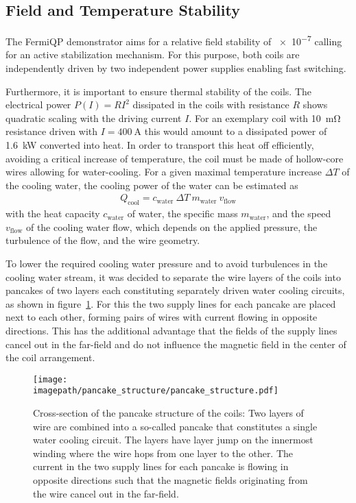 \subsection*{Field and Temperature Stability}
The FermiQP demonstrator aims for a relative field stability of \SI{e-7}{} calling for an active stabilization mechanism. For this purpose, both coils are independently driven by two independent power supplies enabling fast switching.

Furthermore, it is important to ensure thermal stability of the coils. The electrical power $P(I) = RI^2$ dissipated in the coils with resistance $R$ shows quadratic scaling  with the driving current $I$. For an exemplary coil with \SI{10}{\milli\ohm} resistance driven with $I = \SI{400}{\ampere}$ this would amount to a dissipated power of \SI{1.6}{\kilo\watt} converted into heat. In order to transport this heat off efficiently, avoiding a critical increase of temperature, the coil must be made of hollow-core wires allowing for water-cooling. For a given maximal temperature increase $\Delta T$ of the cooling water, the cooling power of the water can be estimated as
\begin{align}
    Q_\text{cool} = c_\text{water} ~ \Delta T ~ m_\text{water} ~ v_\text{flow}
\end{align}
with the heat capacity $ c_\text{water}$ of water, the specific mass $m_\text{water}$, and the speed $v_\text{flow}$ of the cooling water flow, which depends on the applied pressure, the turbulence of the flow, and the wire geometry.

To lower the required cooling water pressure and to avoid turbulences in the cooling water stream, it was decided to separate the wire layers of the coils into pancakes of two layers each constituting separately driven water cooling circuits, as shown in figure~\ref{fig:pancake_structure}. For this the two supply lines for each pancake are placed next to each other, forming pairs of wires with current flowing in opposite directions. This has the additional advantage that the fields of the supply lines cancel out in the far-field and do not influence the magnetic field in the center of the coil arrangement.

\begin{figure}
    \centering
    \texttt{[image: \\imagepath/pancake\_structure/pancake\_structure.pdf]}
    \caption{Cross-section of the pancake structure of the coils: Two layers of wire are combined into a so-called pancake that constitutes a single water cooling circuit. The layers have layer jump on the innermost winding where the wire hops from one layer to the other. The current in the two supply lines for each pancake is flowing in opposite directions such that the magnetic fields originating from the wire cancel out in the far-field.}
    \label{fig:pancake_structure}
\end{figure}

